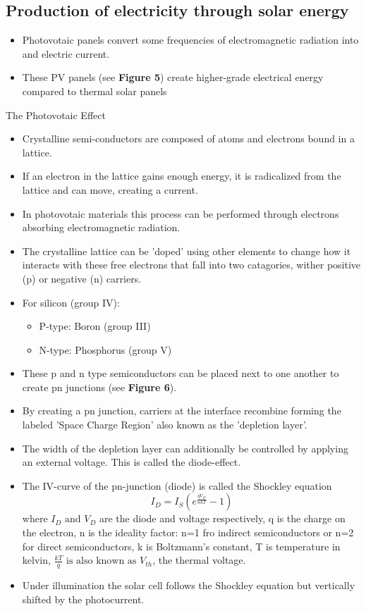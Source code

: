 \documentclass{article}
\begin{document}
    \subsection{Production of electricity through solar energy}
    \begin{itemize}
        \item Photovotaic panels convert some frequencies of electromagnetic radiation into and electric current.
        \item These PV panels (see \textbf{Figure 5}) create higher-grade electrical energy compared to thermal solar panels
    \end{itemize}
    The Photovotaic Effect
    \begin{itemize}
        \item Crystalline semi-conductors are composed of atoms and electrons bound in a lattice.
        \item If an electron in the lattice gains enough energy, it is radicalized from the lattice and can move, creating a current.
        \item In photovotaic materials this process can be performed through electrons absorbing electromagnetic radiation.
        \item The crystalline lattice can be 'doped' using other elements to change how it interacts with these free electrons that fall into
        two catagories, wither positive (p) or negative (n) carriers.
        \newpage
        \item For silicon (group IV):
            \begin{itemize}
                \item P-type: Boron (group III)
                \item N-type: Phosphorus (group V)
            \end{itemize}
        \item These p and n type semiconductors can be placed next to one another to create pn junctions (see \textbf{Figure 6}).
        \item By creating a pn junction, carriers at the interface recombine forming the labeled 'Space Charge Region' also known as the 'depletion layer'.
        \item The width of the depletion layer can additionally be controlled by applying an external voltage. This is called the diode-effect.
        \item The IV-curve of the pn-junction (diode) is called the Shockley equation
        \begin{equation}
            I_D = I_S (e^{\frac{qV_D}{nkT}}-1)
        \end{equation}
        where \(I_D \text{ and } V_D\) are the diode and voltage respectively, q is the charge on the electron, 
        n is the ideality factor: n=1 fro indirect semiconductors or n=2 for direct semiconductors, k is Boltzmann's constant, T is temperature in kelvin, 
        \(\frac{kT}{q} \text{ is also known as } V_{th}\), the thermal voltage.
        \item Under illumination the solar cell follows the Shockley equation but vertically shifted by the photocurrent.
    \end{itemize}
\end{document}
